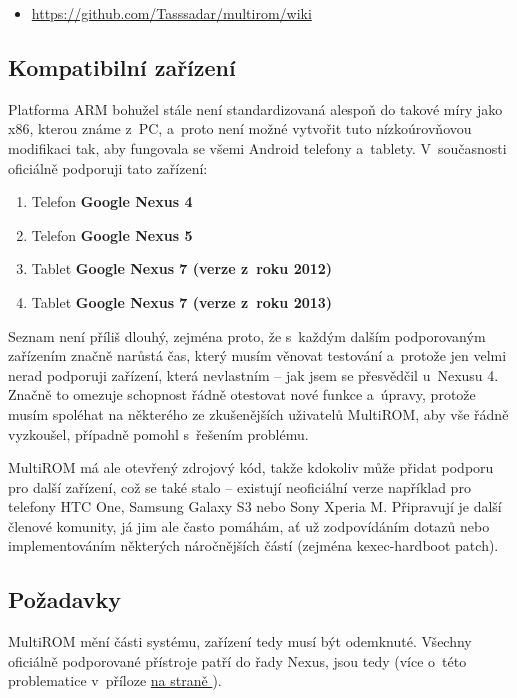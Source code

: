 \documentclass[12pt, a4paper, oneside]{article}
\newcommand{\B}{\textbf} %
\newcommand*{\attref}[1]{\hyperref[{#1}]{\uv{\nameref*{#1}} na straně \pageref{#1}}}
\begin{document}
\begin{itemize}
\item \url{https://github.com/Tasssadar/multirom/wiki}
\end{itemize}

\subsection{Kompatibilní zařízení}
Platforma ARM bohužel stále není standardizovaná alespoň do takové míry jako x86, kterou známe z~PC, a~proto není možné vytvořit tuto nízkoúrovňovou modifikaci tak, aby fungovala se všemi Android telefony a~tablety. V~současnosti oficiálně podporuji tato zařízení:

\begin{enumerate}
    \item Telefon \B{Google Nexus 4}
    \item Telefon \B{Google Nexus 5}
    \item Tablet \B{Google Nexus 7 (verze z~roku 2012)}
    \item Tablet \B{Google Nexus 7 (verze z~roku 2013)}
\end{enumerate}

Seznam není příliš dlouhý, zejména proto, že s~každým dalším podporovaným zařízením značně narůstá čas, který musím věnovat testování a~protože jen velmi nerad podporuji zařízení, která nevlastním -- jak jsem se přesvědčil u~Nexusu 4. Značně to omezuje schopnost řádně otestovat nové funkce a~úpravy, protože musím spoléhat na některého ze zkušenějších uživatelů MultiROM, aby vše řádně vyzkoušel, případně pomohl s~řešením problému.

MultiROM má ale otevřený zdrojový kód, takže kdokoliv může přidat podporu pro další zařízení, což se také stalo -- existují neoficiální verze například pro telefony HTC One, Samsung Galaxy S3 nebo Sony Xperia M. Připravují je další členové komunity, já jim ale často pomáhám, ať už zodpovídáním dotazů nebo implementováním některých náročnějších částí (zejména kexec-hardboot patch).

\subsection{Požadavky}
MultiROM mění části systému, zařízení tedy musí být odemknuté. Všechny oficiálně podporované přístroje patří do řady Nexus, jsou tedy  (více o~této problematice v~příloze \attref{sec:locked}).
\end{document}
